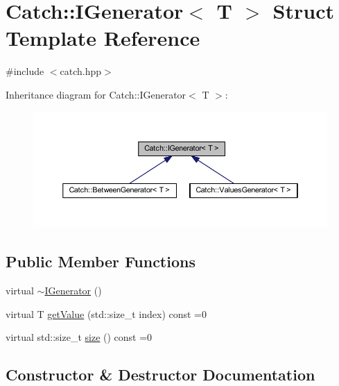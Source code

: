\hypertarget{struct_catch_1_1_i_generator}{}\section{Catch\+:\+:I\+Generator$<$ T $>$ Struct Template Reference}
\label{struct_catch_1_1_i_generator}


{\ttfamily \#include $<$catch.\+hpp$>$}



Inheritance diagram for Catch\+:\+:I\+Generator$<$ T $>$\+:\nopagebreak
\begin{figure}[H]
\begin{center}
\leavevmode
\includegraphics[width=350pt]{struct_catch_1_1_i_generator__inherit__graph}
\end{center}
\end{figure}
\subsection*{Public Member Functions}
\begin{DoxyCompactItemize}
\item 
virtual \hyperlink{struct_catch_1_1_i_generator_a0622037f4617e09aa8c584b0144d4a1a}{$\sim$\+I\+Generator} ()
\item 
virtual T \hyperlink{struct_catch_1_1_i_generator_ad69e937cb66dba3ed9429c42abf4fce3}{get\+Value} (std\+::size\+\_\+t index) const =0
\item 
virtual std\+::size\+\_\+t \hyperlink{struct_catch_1_1_i_generator_a2e317253b03e838b6065ce69719a198e}{size} () const =0
\end{DoxyCompactItemize}


\subsection{Constructor \& Destructor Documentation}
\hypertarget{struct_catch_1_1_i_generator_a0622037f4617e09aa8c584b0144d4a1a}{}\label{struct_catch_1_1_i_generator_a0622037f4617e09aa8c584b0144d4a1a} 
